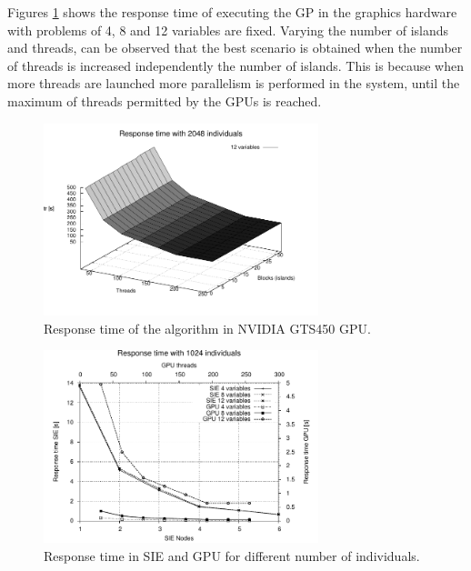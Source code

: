 \documentclass{sig-alternate}
\begin{document}
Figures \ref{fig:rt_gpu3d} shows the response time of executing the GP in the graphics hardware with problems of 4, 8 and 12 variables are fixed. Varying the number of islands and threads, can be observed that the best scenario is obtained when the number of threads is increased independently the number of islands. This is because when more threads are launched more parallelism is performed in the system, until the maximum of threads permitted by the GPUs is reached.




\begin{figure}[h]
\begin{center} 
\includegraphics[width=8cm]{./images/response_time_threads_cuda_12var}
\end{center}
\caption{Response time of the algorithm in NVIDIA GTS450 GPU.}
\label{fig:rt_gpu3d}
\end{figure}


\begin{figure}[h!]
\begin{center} 
\includegraphics[width=8cm]{./images/response_time_1024indiv_gpu} 
\end{center}
\caption{Response time in SIE and GPU for different number of individuals.}
\label{fig:rt_indv2}
\end{figure}
\end{document}
